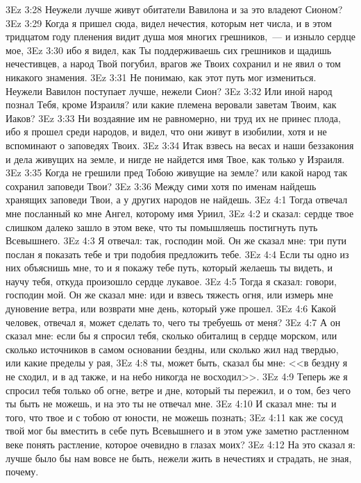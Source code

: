 \vs 3Ez 3:28 Неужели лучше живут обитатели Вавилона и за это владеют Сионом?
\vs 3Ez 3:29 Когда я пришел сюда, видел нечестия, которым нет числа, и в этом тридцатом году пленения видит душа моя многих грешников,~--- и изныло сердце мое,
\vs 3Ez 3:30 ибо я видел, как Ты поддерживаешь сих грешников и щадишь нечестивцев, а народ Твой погубил, врагов же Твоих сохранил и не явил о том никакого знамения.
\vs 3Ez 3:31 Не понимаю, как этот путь мог измениться. Неужели Вавилон поступает лучше, нежели Сион?
\vs 3Ez 3:32 Или иной народ познал Тебя, кроме Израиля? или какие племена веровали заветам Твоим, как Иаков?
\vs 3Ez 3:33 Ни воздаяние им не равномерно, ни труд их не принес плода, ибо я прошел среди народов, и видел, что они живут в изобилии, хотя и не вспоминают о заповедях Твоих.
\vs 3Ez 3:34 Итак взвесь на весах и наши беззакония и дела живущих на земле, и нигде не найдется имя Твое, как только у Израиля.
\vs 3Ez 3:35 Когда не грешили пред Тобою живущие на земле? или какой народ так сохранил заповеди Твои?
\vs 3Ez 3:36 Между сими хотя по именам найдешь хранящих заповеди Твои, а у других народов не найдешь.
\vs 3Ez 4:1 Тогда отвечал мне посланный ко мне Ангел, которому имя Уриил,
\vs 3Ez 4:2 и сказал: сердце твое слишком далеко зашло в этом веке, что ты помышляешь постигнуть путь Всевышнего.
\vs 3Ez 4:3 Я отвечал: так, господин мой. Он же сказал мне: три пути послан я показать тебе и три подобия предложить тебе.
\vs 3Ez 4:4 Если ты одно из них объяснишь мне, то и я покажу тебе путь, который желаешь ты видеть, и научу тебя, откуда произошло сердце лукавое.
\vs 3Ez 4:5 Тогда я сказал: говори, господин мой. Он же сказал мне: иди и взвесь тяжесть огня, или измерь мне дуновение ветра, или возврати мне день, который уже прошел.
\vs 3Ez 4:6 Какой человек, отвечал я, может сделать то, чего ты требуешь от меня?
\vs 3Ez 4:7 А он сказал мне: если бы я спросил тебя, сколько обиталищ в сердце морском, или сколько источников в самом основании бездны, или сколько жил над твердью, или какие пределы у рая,
\vs 3Ez 4:8 ты, может быть, сказал бы мне: <<в бездну я не сходил, и в ад также, и на небо никогда не восходил>>.
\vs 3Ez 4:9 Теперь же я спросил тебя только об огне, ветре и дне, который ты пережил, и о том, без чего ты быть не можешь, и на это ты не отвечал мне.
\vs 3Ez 4:10 И сказал мне: ты и того, что твое и с тобою от юности, не можешь познать;
\vs 3Ez 4:11 как же сосуд твой мог бы вместить в себе путь Всевышнего и в этом уже заметно растленном веке понять растление, которое очевидно в глазах моих?
\vs 3Ez 4:12 На это сказал я: лучше было бы нам вовсе не быть, нежели жить в нечестиях и страдать, не зная, почему.
